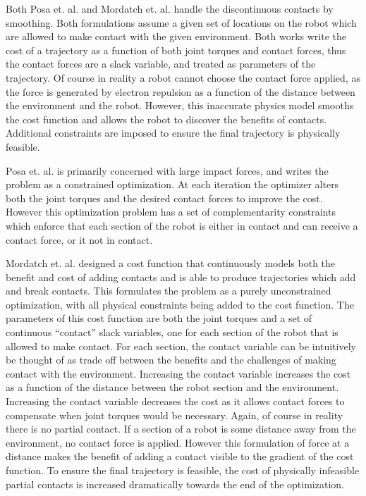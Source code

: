 \documentclass[../thesis.tex]{subfiles}
\begin{document}
Both Posa et. al. \cite{Posa2013} and Mordatch et. al. \cite{Mordatch2012}  handle the discontinuous contacts by smoothing.
Both formulations assume a given set of locations on the robot which are allowed to make contact with the given environment.
Both works write the cost of a trajectory as a function of both joint torques and contact forces, thus the contact forces are a slack variable, and treated as parameters of the trajectory.
Of course in reality a robot cannot choose the contact force applied, as the force is generated by electron repulsion as a function of the distance between the environment and the robot.
However, this inaccurate physics model smooths the cost function and allows the robot to discover the benefits of contacts.
Additional constraints are imposed to ensure the final trajectory is physically feasible.


Posa et. al. is primarily concerned with large impact forces, and writes the problem as a constrained optimization.
At each iteration the optimizer alters both the joint torques and the desired contact forces to improve the cost.
However this optimization problem has a set of complementarity constraints which enforce that each section of the robot is either in contact and can receive a contact force, or it not in contact.

Mordatch et. al. designed a cost function that continuously models both the benefit and cost of adding contacts and is able to produce trajectories which add and break contacts.
This formulates the problem as a purely unconstrained optimization, with all physical constraints being added to the cost function.
The parameters of this cost function are both the joint torques and a set of continuous ``contact'' slack variables, one for each section of the robot that is allowed to make contact.
For each section, the contact variable can be intuitively be thought of as trade off between the benefits and the challenges of making contact with the environment.
Increasing the contact variable increases the cost as a function of the distance between the robot section and the environment.
Increasing the contact variable decreases the cost as it allows contact forces to compensate when joint torques would be necessary.
Again, of course in reality there is no partial contact.
If a section of a robot is some distance away from the environment, no contact force is applied.
However this formulation of force at a distance makes the benefit of adding a contact visible to the gradient of the cost function.
To ensure the final trajectory is feasible, the cost of physically infeasible partial contacts is increased dramatically towards the end of the optimization. 
\end{document}
